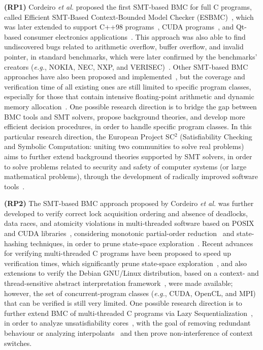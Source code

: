 \documentclass{cta-author}
\begin{document}
\textbf{(RP1)} Cordeiro {\it et al.} proposed the first SMT-based BMC for full C programs, called Efficient SMT-Based Context-Bounded Model Checker (ESBMC)~\cite{Cordeiro12}, which was later extended to support C++98 programs~\cite{ECBS13}, CUDA programs~\cite{cudalucas,Pereira17}, and Qt-based consumer electronics applications~\cite{Sousa15}. This approach was also able to find undiscovered bugs related to arithmetic overflow, buffer overflow, and invalid pointer, in standard benchmarks, which were later confirmed by the benchmarks' creators ({\it e.g.}, NOKIA, NEC, NXP, and VERISEC)~\cite{CordeiroF11,Cordeiro12}. Other SMT-based BMC approaches have also been proposed and implemented~\cite{MerzFS12}, but the coverage and verification time of all existing ones are still limited to specific program classes, especially for those that contain intensive floating-point arithmetic and dynamic memory allocation~\cite{Beyer14,BeyerSVCOMP15}. One possible research direction is to bridge the gap between BMC tools and SMT solvers, propose background theories, and develop more efficient decision procedures, in order to handle specific program classes. In this particular research direction, the European Project SC$^2$ (Satisfiability Checking and Symbolic Computation: uniting two communities to solve real problems) aims to further extend background theories supported by SMT solvers, in order to solve problems related to security and safety of computer systems (or large mathematical problems), through the development of radically improved software tools~\cite{DBLP:journals/cca/AbrahamA0BBBCDE16}.

\textbf{(RP2)} The SMT-based BMC approach proposed by Cordeiro {\it et al.} was further developed to verify correct lock acquisition ordering and absence of deadlocks, data races, and atomicity violations in multi-threaded software based on POSIX and CUDA libraries~\cite{CordeiroF11,Pereira17}, considering monotonic partial-order reduction~\cite{KahlonWG09} and state-hashing techniques, in order to prune state-space exploration~\cite{morse15}. Recent advances for verifying multi-threaded C programs have been proposed to speed up verification times, which significantly prune state-space exploration~\cite{Inverso14,civl15}, and also extensions to verify the Debian GNU/Linux distribution, based on a context- and thread-sensitive abstract interpretation framework~\cite{DBLP:conf/kbse/KroeningPSW16}, were made available; however, the set of concurrent-program classes ({\it e.g.}, CUDA, OpenCL, and MPI) that can be verified is still very limited. One possible research direction is to further extend BMC of multi-threaded C programs via Lazy Sequentialization~\cite{Inverso14}, in order to analyze unsatisfiability cores~\cite{Grumberg05}, with the goal of removing redundant behaviour or analyzing interpolants~\cite{McMillan11} and then prove non-interference of context switches.
\end{document}
